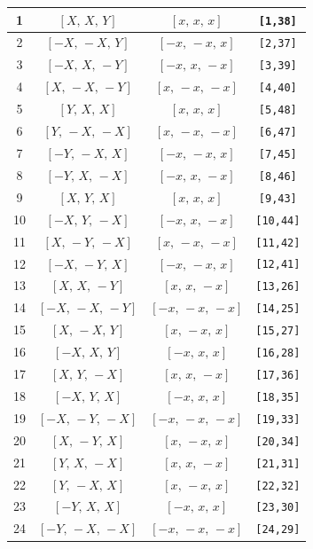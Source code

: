 \documentclass[fleqn,8pt]{jsarticle}
\begin{document}
\begin{longtable}{cccc}
1 & $\left[ X,\, X,\, Y \right]$ & $\left[ x,\, x,\, x \right]$ & {\tt [1,38]} \\ \hline
2 & $\left[ - X,\, - X,\, Y \right]$ & $\left[ - x,\, - x,\, x \right]$ & {\tt [2,37]} \\ \hline
3 & $\left[ - X,\, X,\, - Y \right]$ & $\left[ - x,\, x,\, - x \right]$ & {\tt [3,39]} \\ \hline
4 & $\left[ X,\, - X,\, - Y \right]$ & $\left[ x,\, - x,\, - x \right]$ & {\tt [4,40]} \\ \hline
5 & $\left[ Y,\, X,\, X \right]$ & $\left[ x,\, x,\, x \right]$ & {\tt [5,48]} \\ \hline
6 & $\left[ Y,\, - X,\, - X \right]$ & $\left[ x,\, - x,\, - x \right]$ & {\tt [6,47]} \\ \hline
7 & $\left[ - Y,\, - X,\, X \right]$ & $\left[ - x,\, - x,\, x \right]$ & {\tt [7,45]} \\ \hline
8 & $\left[ - Y,\, X,\, - X \right]$ & $\left[ - x,\, x,\, - x \right]$ & {\tt [8,46]} \\ \hline
9 & $\left[ X,\, Y,\, X \right]$ & $\left[ x,\, x,\, x \right]$ & {\tt [9,43]} \\ \hline
10 & $\left[ - X,\, Y,\, - X \right]$ & $\left[ - x,\, x,\, - x \right]$ & {\tt [10,44]} \\ \hline
11 & $\left[ X,\, - Y,\, - X \right]$ & $\left[ x,\, - x,\, - x \right]$ & {\tt [11,42]} \\ \hline
12 & $\left[ - X,\, - Y,\, X \right]$ & $\left[ - x,\, - x,\, x \right]$ & {\tt [12,41]} \\ \hline
13 & $\left[ X,\, X,\, - Y \right]$ & $\left[ x,\, x,\, - x \right]$ & {\tt [13,26]} \\ \hline
14 & $\left[ - X,\, - X,\, - Y \right]$ & $\left[ - x,\, - x,\, - x \right]$ & {\tt [14,25]} \\ \hline
15 & $\left[ X,\, - X,\, Y \right]$ & $\left[ x,\, - x,\, x \right]$ & {\tt [15,27]} \\ \hline
16 & $\left[ - X,\, X,\, Y \right]$ & $\left[ - x,\, x,\, x \right]$ & {\tt [16,28]} \\ \hline
17 & $\left[ X,\, Y,\, - X \right]$ & $\left[ x,\, x,\, - x \right]$ & {\tt [17,36]} \\ \hline
18 & $\left[ - X,\, Y,\, X \right]$ & $\left[ - x,\, x,\, x \right]$ & {\tt [18,35]} \\ \hline
19 & $\left[ - X,\, - Y,\, - X \right]$ & $\left[ - x,\, - x,\, - x \right]$ & {\tt [19,33]} \\ \hline
20 & $\left[ X,\, - Y,\, X \right]$ & $\left[ x,\, - x,\, x \right]$ & {\tt [20,34]} \\ \hline
21 & $\left[ Y,\, X,\, - X \right]$ & $\left[ x,\, x,\, - x \right]$ & {\tt [21,31]} \\ \hline
22 & $\left[ Y,\, - X,\, X \right]$ & $\left[ x,\, - x,\, x \right]$ & {\tt [22,32]} \\ \hline
23 & $\left[ - Y,\, X,\, X \right]$ & $\left[ - x,\, x,\, x \right]$ & {\tt [23,30]} \\ \hline
24 & $\left[ - Y,\, - X,\, - X \right]$ & $\left[ - x,\, - x,\, - x \right]$ & {\tt [24,29]} \\
\end{longtable}
\end{document}

